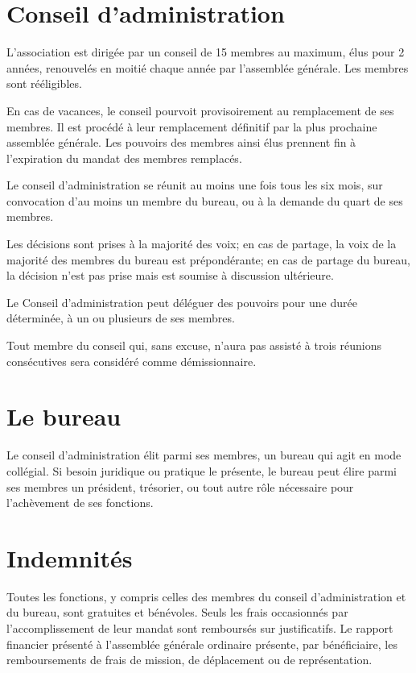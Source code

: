 \documentclass[11 pt]{article}
\begin{document}
\section{Conseil d'administration}

L'association est dirigée par un conseil de 15 membres au maximum,
élus pour 2 années, renouvelés en moitié chaque année par l'assemblée
générale. Les membres sont rééligibles.

En cas de vacances, le conseil pourvoit provisoirement au remplacement
de ses membres. Il est procédé à leur remplacement définitif par la
plus prochaine assemblée générale. Les pouvoirs des membres ainsi élus
prennent fin à l'expiration du mandat des membres remplacés.

Le conseil d'administration se réunit au moins une fois tous les six
mois, sur convocation d'au moins un membre du bureau, ou à la demande
du quart de ses membres.

Les décisions sont prises à la majorité des voix; en cas de partage,
la voix de la majorité des membres du bureau est prépondérante; en cas
de partage du bureau, la décision n'est pas prise mais est soumise à
discussion ultérieure.

Le Conseil d'administration peut déléguer des pouvoirs pour une durée
déterminée, à un ou plusieurs de ses membres.

Tout membre du conseil qui, sans excuse, n'aura pas assisté à trois
réunions consécutives sera considéré comme démissionnaire.


\section{Le bureau}

Le conseil d'administration élit parmi ses membres, un bureau qui agit
en mode collégial.  Si besoin juridique ou pratique le présente, le
bureau peut élire parmi ses membres un président, trésorier, ou tout
autre rôle nécessaire pour l'achèvement de ses fonctions.

\section{Indemnités}

Toutes les fonctions, y compris celles des membres du conseil
d’administration et du bureau, sont gratuites et bénévoles. Seuls les
frais occasionnés par l’accomplissement de leur mandat sont remboursés
sur justificatifs. Le rapport financier présenté à l’assemblée
générale ordinaire présente, par bénéficiaire, les remboursements de
frais de mission, de déplacement ou de représentation.
\end{document}
